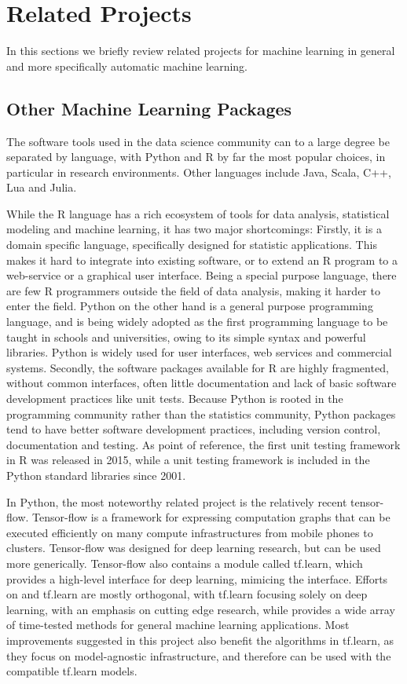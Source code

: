 \section{Related Projects}
In this sections we briefly review related projects for machine learning in general
and more specifically automatic machine learning.

\subsection{Other Machine Learning Packages}\label{otherpackages}
The software tools used in the data science community can to a large degree be
separated by language, with Python and R by far the most popular choices, in
particular in research environments. Other languages include Java, Scala, C++, Lua and Julia.

While the R language has a rich ecosystem of tools for data analysis,
statistical modeling and machine learning, it has two major shortcomings:
Firstly, it is a domain specific language, specifically designed for statistic
applications. This makes it hard to integrate into existing software, or to
extend an R program to a web-service or a graphical user interface. Being a
special purpose language, there are few R programmers outside the field of data
analysis, making it harder to enter the field.
Python on the other hand is a general purpose programming language, and is being
widely adopted as the first programming language to be taught in schools and
universities, owing to its simple syntax and powerful libraries. Python is widely used
for user interfaces, web services and commercial systems.
Secondly, the software packages available for R are highly fragmented, without
common interfaces, often little documentation and lack of basic software development
practices like unit tests. Because Python is rooted in the programming community
rather than the statistics community, Python packages tend to have better software
development practices, including version control, documentation and testing. As point
of reference, the first unit testing framework in R was released in 2015, while a unit
testing framework is included in the Python standard libraries since 2001.

In Python, the most noteworthy related project is the relatively recent
tensor-flow. Tensor-flow is a framework for expressing computation graphs that
can be executed efficiently on many compute infrastructures from mobile phones to clusters.
Tensor-flow was designed for deep learning research, but can
be used more generically. Tensor-flow also
contains a module called tf.learn, which provides a high-level interface for deep learning,
mimicing the \sklearn{} interface.
Efforts on \sklearn{} and tf.learn are mostly orthogonal, with tf.learn
focusing solely on deep learning, with an emphasis on cutting edge research,
while \sklearn{} provides a wide array of time-tested methods for general
machine learning applications. Most improvements suggested in this project also
benefit the algorithms in tf.learn, as they focus on model-agnostic
infrastructure, and therefore can be used with the \sklearn{}
compatible tf.learn models.

